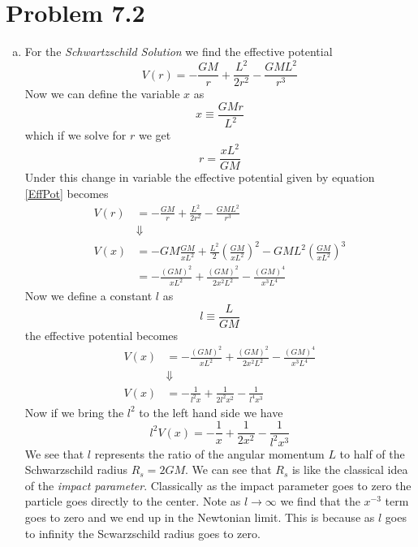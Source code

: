 \documentclass[11pt]{article}
\numberwithin{equation}{section}
\newcommand{\HWnum}{7}
\begin{document}
\section{Problem \HWnum.2}
\begin{enumerate}[(a)]
\item
For the \emph{Schwartzschild Solution} we find the effective potential
\begin{equation}
V(r) = -\frac{GM}{r} + \frac{L^2}{2r^2} - \frac{GML^2}{r^3}
\label{EffPot}
\end{equation}
Now we can define the variable $x$ as
$$x\equiv \frac{GMr}{L^2}$$
which if we solve for $r$ we get
$$r = \frac{xL^2}{GM}$$
Under this change in variable the effective potential given by equation \ref{EffPot} becomes
\begin{align*}
V(r) &= -\frac{GM}{r} + \frac{L^2}{2r^2} - \frac{GML^2}{r^3}\\
&\Downarrow\\
V(x) &= -GM\frac{GM}{xL^2} + \frac{L^2}{2}\left(\frac{GM}{xL^2}\right)^2 - GML^2\left(\frac{GM}{xL^2}\right)^3\\
&= -\frac{(GM)^2}{xL^2} + \frac{(GM)^2}{2x^2L^2} - \frac{(GM)^4}{x^3L^4}
\end{align*}
Now we define a constant $l$ as
$$l\equiv \frac{L}{GM}$$
the effective potential becomes
\begin{align*}
V(x) &= -\frac{(GM)^2}{xL^2} + \frac{(GM)^2}{2x^2L^2} - \frac{(GM)^4}{x^3L^4}\\
&\Downarrow\\
V(x) &= -\frac{1}{l^2x} + \frac{1}{2l^2x^2} - \frac{1}{l^4x^3}
\end{align*}
Now if we bring the $l^2$ to the left hand side we have
$$l^2V(x) = -\frac{1}{x} + \frac{1}{2x^2} - \frac{1}{l^2x^3}$$
We see that $l$ represents the ratio of the angular momentum $L$ to half of the Schwarzschild radius $R_s = 2GM$. We can see that $R_s$ is like the classical idea of the \emph{impact parameter}. Classically as the impact parameter goes to zero the particle goes directly to the center. Note as $l\rightarrow\infty$ we find that the $x^{-3}$ term goes to zero and we end up in the Newtonian limit. This is because as $l$ goes to infinity the Scwarzschild radius goes to zero. 


\end{enumerate}
\end{document}
